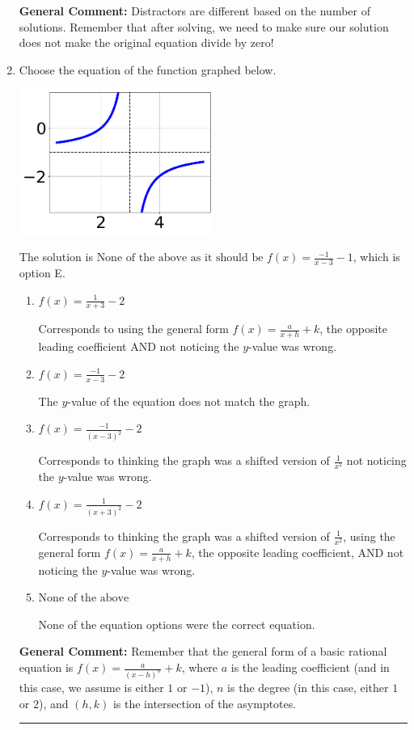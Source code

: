 \documentclass{extbook}[14pt]
\newcommand{\litem}[1]{\item #1

\rule{\textwidth}{0.4pt}}
\begin{document}
\begin{enumerate}
{\begin{enumerate}[label=\Alph*.]
\end{enumerate}

\textbf{General Comment:} Distractors are different based on the number of solutions. Remember that after solving, we need to make sure our solution does not make the original equation divide by zero!
}
\litem{
Choose the equation of the function graphed below.

\begin{center}
    \includegraphics[width=0.5\textwidth]{../Figures/rationalGraphToEquationA.png}
\end{center}


The solution is \( \text{None of the above as it should be } f(x) = \frac{-1}{x - 3} - 1 \), which is option E.\begin{enumerate}[label=\Alph*.]
\item \( f(x) = \frac{1}{x + 3} - 2 \)

Corresponds to using the general form $f(x) = \frac{a}{x+h}+k$, the opposite leading coefficient AND not noticing the $y$-value was wrong.
\item \( f(x) = \frac{-1}{x - 3} - 2 \)

The $y$-value of the equation does not match the graph.
\item \( f(x) = \frac{-1}{(x - 3)^2} - 2 \)

Corresponds to thinking the graph was a shifted version of $\frac{1}{x^2}$ not noticing the $y$-value was wrong.
\item \( f(x) = \frac{1}{(x + 3)^2} - 2 \)

Corresponds to thinking the graph was a shifted version of $\frac{1}{x^2}$, using the general form $f(x) = \frac{a}{x+h}+k$, the opposite leading coefficient, AND not noticing the $y$-value was wrong.
\item \( \text{None of the above} \)

None of the equation options were the correct equation.
\end{enumerate}

\textbf{General Comment:} Remember that the general form of a basic rational equation is $ f(x) = \frac{a}{(x-h)^n} + k$, where $a$ is the leading coefficient (and in this case, we assume is either $1$ or $-1$), $n$ is the degree (in this case, either $1$ or $2$), and $(h, k)$ is the intersection of the asymptotes.
}
\end{enumerate}
\end{document}
